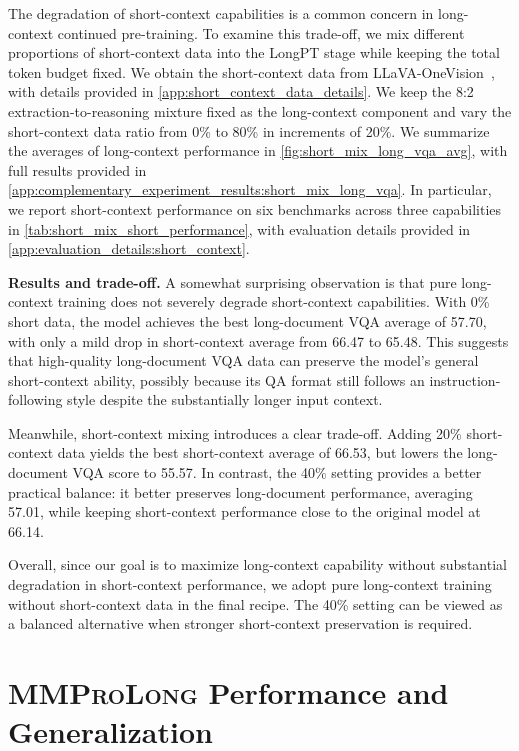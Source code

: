 \documentclass{llmxive}
\providecommand{\modelname}{\textsc{\textbf{MMProLong}}\xspace}
\begin{document}
{\begin{figure}[t]
\end{figure}
The degradation of short-context capabilities is a common concern in long-context continued pre-training.
To examine this trade-off, we mix different proportions of short-context data into the LongPT stage while keeping the total token budget fixed.
We obtain the short-context data from LLaVA-OneVision~\citep{li2024llava}, with details provided in \cref{app:short_context_data_details}.
We keep the 8:2 extraction-to-reasoning mixture fixed as the long-context component and vary the short-context data ratio from 0\% to 80\% in increments of 20\%.
We summarize the averages of long-context performance in \cref{fig:short_mix_long_vqa_avg}, with full results provided in \cref{app:complementary_experiment_results:short_mix_long_vqa}.
In particular, we report short-context performance on six benchmarks across three capabilities in \cref{tab:short_mix_short_performance}, with evaluation details provided in \cref{app:evaluation_details:short_context}.

\noindent\textbf{Results and trade-off.}
A somewhat surprising observation is that pure long-context training does not severely degrade short-context capabilities.
With 0\% short data, the model achieves the best long-document VQA average of 57.70, with only a mild drop in short-context average from 66.47 to 65.48.
This suggests that high-quality long-document VQA data can preserve the model's general short-context ability, possibly because its QA format still follows an instruction-following style despite the substantially longer input context.

Meanwhile, short-context mixing introduces a clear trade-off.
Adding 20\% short-context data yields the best short-context average of 66.53, but lowers the long-document VQA score to 55.57.
In contrast, the 40\% setting provides a better practical balance: it better preserves long-document performance, averaging 57.01, while keeping short-context performance close to the original model at 66.14.

Overall, since our goal is to maximize long-context capability without substantial degradation in short-context performance, we adopt pure long-context training without short-context data in the final recipe.
The 40\% setting can be viewed as a balanced alternative when stronger short-context preservation is required.

\section{\modelname Performance and Generalization}
\label{sec:final_results}

}
\end{document}

